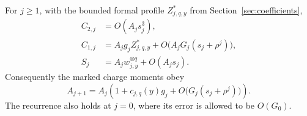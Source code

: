 \begin{lemma}\label{mark:connected-comparison}
For $j\ge1$, with the bounded formal profile $Z_{j,q,y}^*$ from
Section~\ref{sec:coefficients},
\begin{align}
 C_{2,j}&=O(A_js_j^3),\label{mark:c2}\\
 C_{1,j}&=A_jg_j Z_{j,q,y}^*
       +O\bigl(A_jG_j(s_j+\rho^j)\bigr),\label{mark:c1}\\
 S_j&=A_jw_{j,y}^{\otimes q}+O(A_js_j).\label{mark:s-profile}
\end{align}
Consequently the marked charge moments obey
\begin{equation}\label{mark:scalar-recursion}
 A_{j+1}=A_j\left(1+c_{j,q}(y)g_j+
                    O\bigl(G_j(s_j+\rho^j)\bigr)\right).
\end{equation}
The recurrence also holds at $j=0$, where its error is allowed to be
$O(G_0)$.
\end{lemma}

